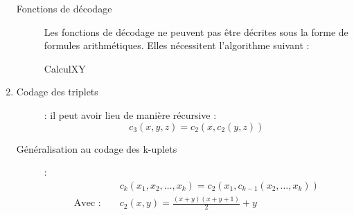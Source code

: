 \begin{enumerate}
\begin{description}
\item[Fonctions de décodage]
Les fonctions de décodage ne peuvent pas être décrites sous la forme de formules arithmétiques. Elles nécessitent l'algorithme suivant :

\begin{algorithm}[H]
  \caption{CalculXY}
\end{algorithm}
\end{description}

\item 
\begin{description}
\item[Codage des triplets] : il peut avoir lieu de manière récursive :
\[ c_3(x,y,z)=c_2(x,c_2(y,z)) \]
\item[Généralisation au codage des k-uplets] : 
\begin{eqnarray*}
& &c_k(x_1,x_2,\ldots,x_k)=c_2(x_1,c_{k-1}(x_2,\ldots,x_k)) \\
\textrm{Avec : } & &c_2(x,y)=\frac{(x+y)(x+y+1)}{2}+y
\end{eqnarray*}



\end{description}

\end{enumerate}